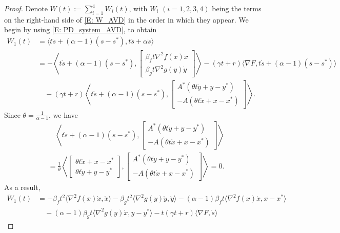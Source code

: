 \documentclass[pdflatex,sn-mathphys-num]{sn-jnl}
\theoremstyle{thmstyleone}
\theoremstyle{thmstyletwo}
\theoremstyle{thmstylethree}
\begin{document}
\begin{proof}
Denote $W(t) := \sum_{i=1}^4 W_i(t)$, with $W_i$ $(i=1,2,3,4)$ being the terms on the right-hand side of \eqref{E: W_AVD} in the order in which they appear. We begin by using \eqref{E: PD_system_AVD}, to obtain
\begin{align*}
\dot{W}_1(t)
&= \langle t\dot{s} + (\alpha-1)(s-s^*), t\ddot{s} + \alpha\dot{s} \rangle \\
&= -\left\langle t\dot{s} + (\alpha-1)(s-s^*), \begin{bmatrix}
   \beta_f t \nabla^2 f(x) \dot{x}\\[2pt]
   \beta_g t \nabla^2 g(y) \dot{y}
   \end{bmatrix} \right\rangle 
 - ( \gamma t + r ) \langle \nabla F, t\dot{s} + (\alpha-1)(s-s^*) \rangle \\
&\quad - ( \gamma t + r ) \left\langle t\dot{s} + (\alpha-1)(s-s^*), \begin{bmatrix}
A^* ( \theta t \dot{y} + y - y^* ) \\[2pt]
- A( \theta t \dot{x} + x - x^* )
\end{bmatrix} \right\rangle.
\end{align*}
Since $\theta = \frac{1}{\alpha-1}$, we have
\begin{align*}
&\quad \left\langle t\dot{s} + (\alpha-1)(s-s^*), \begin{bmatrix}
A^* ( \theta t \dot{y} + y - y^* ) \\[2pt]
- A( \theta t \dot{x} + x - x^* )
\end{bmatrix} \right\rangle \\ 
&= \frac{1}{\theta}\left\langle \begin{bmatrix}
\theta t \dot{x} + x-x^*\\[2pt]
\theta t \dot{y} + y-y^*
\end{bmatrix}, \begin{bmatrix}
A^* ( \theta t \dot{y} + y - y^* ) \\[2pt]
- A( \theta t \dot{x} + x - x^* )
\end{bmatrix} \right\rangle = 0.
\end{align*}
As a result,
\begin{align*}
\dot{W}_1(t)
&= - \beta_f t^2 \langle \nabla^2 f(x)\dot{x}, \dot{x} \rangle 
   - \beta_g t^2 \langle \nabla^2 g(y)\dot{y}, \dot{y} \rangle  
   - (\alpha-1)\beta_f t \langle \nabla^2 f(x)\dot{x}, x-x^* \rangle \\
&\quad - (\alpha-1)\beta_g t \langle \nabla^2 g(y)\dot{x}, y-y^* \rangle 
   - t(\gamma t + r) \langle \nabla F, \dot{s} \rangle 

\end{align*}
\end{proof}
\end{document}

